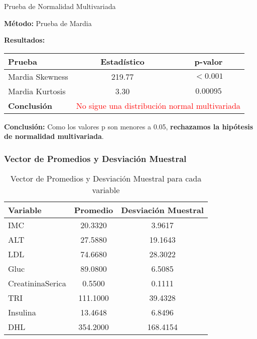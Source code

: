 

\begin{frame}{Prueba de Normalidad Multivariada}

    \textbf{Método:} Prueba de Mardia  

    \textbf{Resultados:}  
    \begin{table}[]
        \centering
        \begin{tabular}{lcc}
            \toprule
            \textbf{Prueba} & \textbf{Estadístico} & \textbf{p-valor} \\
            \midrule
            Mardia Skewness & 219.77 & $< 0.001$ \\
            Mardia Kurtosis & 3.30 & $0.00095$ \\
            \midrule
            \textbf{Conclusión} & \multicolumn{2}{c}{\textcolor{red}{No sigue una distribución normal multivariada}} \\
            \bottomrule
        \end{tabular}
    \end{table}

    \bigskip
    \textbf{Conclusión:}  
    Como los valores p son menores a 0.05, \textbf{rechazamos la hipótesis de normalidad multivariada}.  
    
\end{frame}



\begin{frame}
  \frametitle{Vector de Promedios y Desviación Muestral}

  \begin{table}[ht]
    \centering
    \begin{tabular}{|l|c|c|}
      \hline
      \textbf{Variable} & \textbf{Promedio} & \textbf{Desviación Muestral} \\
      \hline
      IMC & 20.3320 & 3.9617 \\
      ALT & 27.5880 & 19.1643 \\
      LDL & 74.6680 & 28.3022 \\
      Gluc & 89.0800 & 6.5085 \\
      CreatininaSerica & 0.5500 & 0.1111 \\
      TRI & 111.1000 & 39.4328 \\
      Insulina & 13.4648 & 6.8496 \\
      DHL & 354.2000 & 168.4154 \\
      \hline
    \end{tabular}
    \caption{Vector de Promedios y Desviación Muestral para cada variable}
  \end{table}

\end{frame}